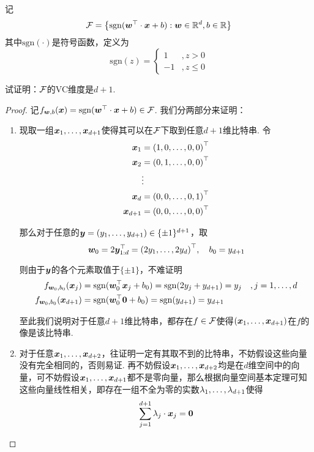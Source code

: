 
\begin{exercise}
    记 
    \[
    \mathcal{F} = \left\{
        \mathrm{sgn}(\boldsymbol{w}^{\top}\cdot \boldsymbol{x} + b): \boldsymbol{w}\in \mathbb{R}^d, b\in \mathbb{R} 
    \right\}
    \]
    其中$\mathrm{sgn}(\cdot)$是符号函数，定义为 
    \[
    \mathrm{sgn}(z) = \begin{cases}
    1 & ,z > 0\\
    -1 & ,z \le 0
    \end{cases}
    \]

    试证明：$\mathcal{F}$的VC维度是$d+1$.
\end{exercise}

\begin{proof}
记$f_{\boldsymbol{w}, b}(\boldsymbol{x}) = \mathrm{sgn}(\boldsymbol{w}^\top \cdot \boldsymbol{x} + b) \in \mathcal{F}$. 我们分两部分来证明：
\begin{enumerate}
    \item[\Circled{1}] 现取一组$\boldsymbol{x}_1, \dots, \boldsymbol{x}_{d+1}$使得其可以在$\mathcal{F}$下取到任意$d+1$维比特串. 令
    \begin{align*}
        \boldsymbol{x}_1 & = {(1, 0, \dots, 0, 0)}^\top \\
        \boldsymbol{x}_2 & = {(0, 1, \dots, 0, 0)}^\top \\
                & \vdots \\
        \boldsymbol{x}_d & = {(0, 0, \dots, 0, 1)}^\top \\
        \boldsymbol{x}_{d+1} & = {(0, 0, \dots, 0, 0)}^\top
    \end{align*}
    
    那么对于任意的$\boldsymbol{y} = (y_1, \dots, y_{d+1}) \in \{\pm 1\}^{d+1}$，取 
    \[
    \boldsymbol{w}_0 = 2\boldsymbol{y}_{1:d}^\top = {(2y_1, \dots, 2y_{d})}^\top, \quad b_0 = y_{d+1}
    \]

    则由于$\boldsymbol{y}$的各个元素取值于$\{\pm 1\}$，不难证明
    \begin{align*}
        f_{\boldsymbol{w}_0, b_0}(\boldsymbol{x}_j) & = \mathrm{sgn}(\boldsymbol{w}_0^\top \boldsymbol{x}_j+ b_0) = \mathrm{sgn}(2y_j + y_{d+1}) = y_j &, j=1,\dots,d \\
        f_{\boldsymbol{w}_0, b_0}(\boldsymbol{x}_{d+1}) & = \mathrm{sgn}(\boldsymbol{w}_0^\top \boldsymbol{0}+ b_0) = \mathrm{sgn}(y_{d+1}) = y_{d+1}
    \end{align*}
    
    至此我们说明对于任意$d+1$维比特串，都存在$f\in \mathcal{F}$使得$(\boldsymbol{x}_1, \dots, \boldsymbol{x}_{d+1})$在$f$的像是该比特串. 

    \item[\Circled{2}] 对于任意$\boldsymbol{x}_1, \dots, \boldsymbol{x}_{d+2}$，往证明一定有其取不到的比特串，不妨假设这些向量没有完全相同的，否则易证. 再不妨假设$\boldsymbol{x}_1, \dots, \boldsymbol{x}_{d+2}$均是在$d$维空间中的向量，可不妨假设$\boldsymbol{x}_1, \dots, \boldsymbol{x}_{d+1}$都不是零向量，那么根据向量空间基本定理可知这些向量线性相关，即存在一组不全为零的实数$\lambda_1, \dots, \lambda_{d+1}$使得 
    \[
    \sum_{j=1}^{d+1} \lambda_j \cdot \boldsymbol{x}_j = \boldsymbol{0}
    \]


\end{enumerate}
\end{proof}
